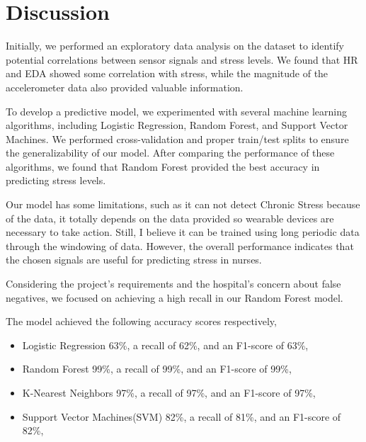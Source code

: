 \documentclass{article}
\begin{document}
\section{Discussion}

Initially, we performed an exploratory data analysis on the dataset to identify potential correlations between sensor signals and stress levels. We found that HR and EDA showed some correlation with stress, while the magnitude of the accelerometer data also provided valuable information.

To develop a predictive model, we experimented with several machine learning algorithms, including Logistic Regression, Random Forest, and Support Vector Machines. We performed cross-validation and proper train/test splits to ensure the generalizability of our model. After comparing the performance of these algorithms, we found that Random Forest provided the best accuracy in predicting stress levels.\cite{stressmonitoring_iq3244}

Our model has some limitations, such as it can not detect Chronic Stress because of the data, it totally depends on the data provided so wearable devices are necessary to take action. Still, I believe it can be trained using long periodic data through the windowing of data. However, the overall performance indicates that the chosen signals are useful for predicting stress in nurses.

Considering the project's requirements and the hospital's concern about false negatives, we focused on achieving a high recall in our Random Forest model. 

The model achieved the following accuracy scores respectively,

\begin{itemize}
\item Logistic Regression 63\%, a recall of 62\%, and an F1-score of 63\%, 
\item Random Forest 99\%, a recall of 99\%, and an F1-score of 99\%,
\item K-Nearest Neighbors 97\%, a recall of 97\%, and an F1-score of 97\%,
\item Support Vector Machines(SVM) 82\%, a recall of 81\%, and an F1-score of 82\%,
\end{itemize}
\end{document}
